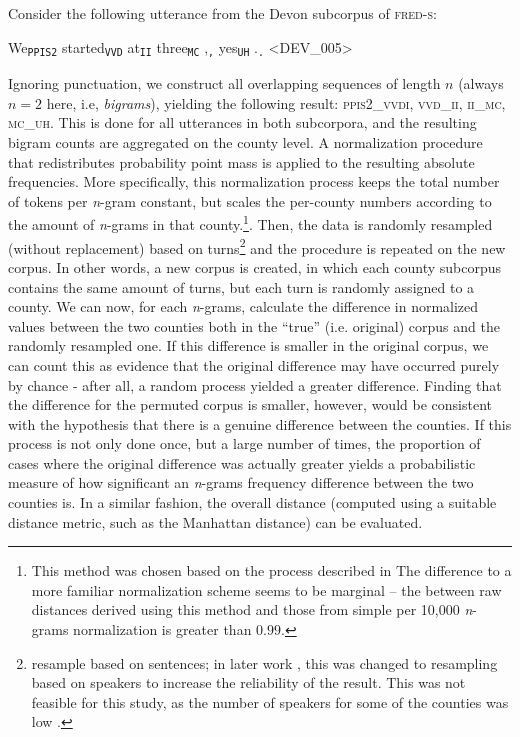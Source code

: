 \documentclass[output=paper]{LSP/langsci}
\begin{document}
Consider the following utterance from the Devon subcorpus of \textsc{fred-s}:

\begin{exe}
\ex We\textsubscript{\texttt{PPIS2}} started\textsubscript{\texttt{VVD}} at\textsubscript{\texttt{II}} three\textsubscript{\texttt{MC}} ,\textsubscript{\texttt{,}} yes\textsubscript{\texttt{UH}} .\textsubscript{\texttt{.}}  <DEV\_005>
\end{exe}

Ignoring punctuation, we construct all overlapping sequences of length $n$ (always $n=2$ here, i.e, \emph{bigrams}), yielding the following result: \textsc{ppis2\_vvdi}, \textsc{vvd\_ii}, \textsc{ii\_mc}, \textsc{mc\_uh}. 
This is done for all utterances in both subcorpora, and the resulting bigram counts are aggregated on the county level.
A normalization procedure that redistributes probability point mass is applied to the resulting absolute frequencies.
More specifically, this normalization process keeps the total number of tokens per \emph{n}-gram constant, but scales the per-county numbers according to the amount of \emph{n}-grams in that county.\footnote{This method was chosen based on the process described in \citet{nerbonne_measure_2006}
The difference to a more familiar normalization scheme seems to be marginal -- the  between raw distances derived using this method and those from simple per 10,000 \emph{n}-grams normalization is greater than $0.99$.}.
Then, the data is randomly resampled (without replacement) based on turns\footnote{\citet{nerbonne_measure_2006} resample based on sentences; in later work \citep{wiersma_automatically_2011}, this was changed to resampling based on speakers to increase the reliability of the result.
This was not feasible for this study, as the number of speakers for some of the counties was low \citep[see also][]{sanders_statistical_2010}.}
and the procedure is repeated on the new corpus.
In other words, a new corpus is created, in which each county subcorpus contains the same amount of turns, but each turn is randomly assigned to a county.
We can now, for each \emph{n}-grams, calculate the difference in normalized values between the two counties both in the ``true'' (i.e. original) corpus and the randomly resampled one.
If this difference is smaller in the original corpus, we can count this as evidence that the original difference may have occurred purely by chance - after all, a random process yielded a greater difference.
Finding that the difference for the permuted corpus is smaller, however, would be consistent with the hypothesis that there is a genuine difference between the counties.
If this process is not only done once, but a large number of times, the proportion of cases where the original difference was actually greater yields a probabilistic measure of how significant an \emph{n}-grams frequency difference between the two counties is.
In a similar fashion, the overall distance (computed using a suitable distance metric, such as the Manhattan distance) can be evaluated.
\end{document}
